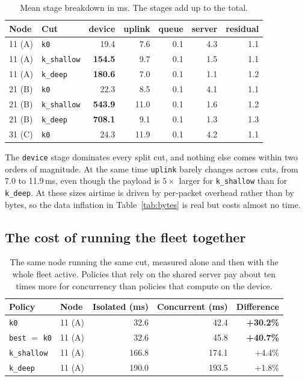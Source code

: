 \documentclass[11pt,a4paper]{article}
\begin{document}
\begin{table}[h]
\centering
\begin{tabular}{llrrrrr}
\toprule
Node & Cut & device & uplink & queue & server & residual \\
\midrule
11 (A) & \texttt{k0}         & 19.4 & 7.6 & 0.1 & 4.3 & 1.1 \\
11 (A) & \texttt{k\_shallow} & \textbf{154.5} & 9.7 & 0.1 & 1.5 & 1.1 \\
11 (A) & \texttt{k\_deep}    & \textbf{180.6} & 7.0 & 0.1 & 1.1 & 1.2 \\
21 (B) & \texttt{k0}         & 22.3 & 8.5 & 0.1 & 4.1 & 1.1 \\
21 (B) & \texttt{k\_shallow} & \textbf{543.9} & 11.0 & 0.1 & 1.6 & 1.2 \\
21 (B) & \texttt{k\_deep}    & \textbf{708.1} & 9.1 & 0.1 & 1.3 & 1.3 \\
31 (C) & \texttt{k0}         & 24.3 & 11.9 & 0.1 & 4.2 & 1.1 \\
\bottomrule
\end{tabular}
\caption{Mean stage breakdown in ms. The stages add up to the total.}
\label{tab:stages}
\end{table}

The \texttt{device} stage dominates every split cut, and nothing else comes
within two orders of magnitude. At the same time \texttt{uplink} barely changes
across cuts, from 7.0 to 11.9\,ms, even though the payload is $5\times$ larger
for \texttt{k\_shallow} than for \texttt{k\_deep}. At these sizes airtime is
driven by per-packet overhead rather than by bytes, so the data inflation in
Table~\ref{tab:bytes} is real but costs almost no time.

\subsection{The cost of running the fleet together}

\begin{table}[h]
\centering
\begin{tabular}{llrrr}
\toprule
Policy & Node & Isolated (ms) & Concurrent (ms) & Difference \\
\midrule
\texttt{k0}          & 11 (A) & 32.6 & 42.4 & \textbf{+30.2\%} \\
\texttt{best} $=$ \texttt{k0} & 11 (A) & 32.6 & 45.8 & \textbf{+40.7\%} \\
\texttt{k\_shallow}  & 11 (A) & 166.8 & 174.1 & +4.4\% \\
\texttt{k\_deep}     & 11 (A) & 190.0 & 193.5 & +1.8\% \\
\bottomrule
\end{tabular}
\caption{The same node running the same cut, measured alone and then with the
whole fleet active. Policies that rely on the shared server pay about ten times
more for concurrency than policies that compute on the device.}
\label{tab:coupling}
\end{table}
\end{document}
